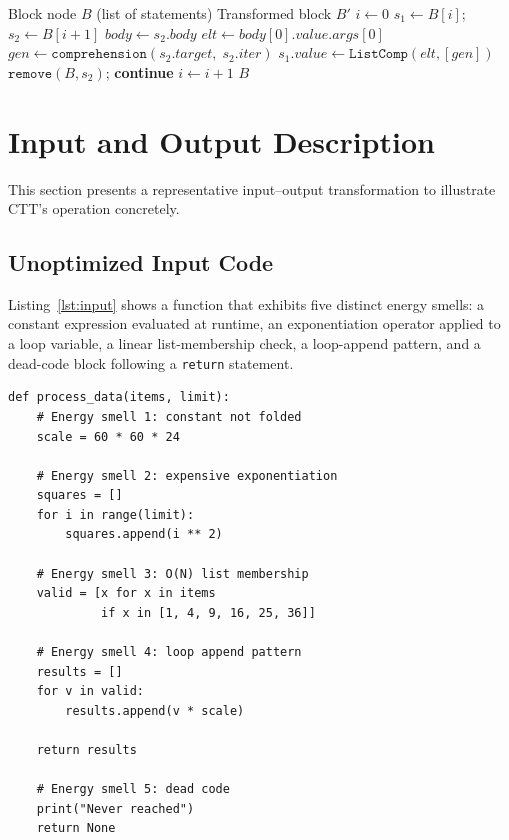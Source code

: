 \documentclass[conference]{IEEEtran}
\begin{document}
\begin{algorithm}[H]
\caption{Loop-Append-to-Comprehension Sub-pass}
\label{alg:comp}
\begin{algorithmic}[1]
\REQUIRE Block node $B$ (list of statements)
\ENSURE  Transformed block $B'$
\STATE $i \leftarrow 0$
  \STATE $s_1 \leftarrow B[i]$; $s_2 \leftarrow B[i+1]$
    \STATE $\textit{body} \leftarrow s_2.\textit{body}$
        \STATE $\textit{elt} \leftarrow \textit{body}[0].\textit{value}.\textit{args}[0]$
        \STATE $\textit{gen} \leftarrow \texttt{comprehension}(s_2.\textit{target},\; s_2.\textit{iter})$
        \STATE $s_1.\textit{value} \leftarrow \texttt{ListComp}(\textit{elt}, [\textit{gen}])$
        \STATE $\texttt{remove}(B, s_2)$; \textbf{continue}
      \ENDIF
    \ENDIF
  \ENDIF
  \STATE $i \leftarrow i + 1$
\ENDWHILE
\RETURN $B$
\end{algorithmic}
\end{algorithm}

\section{Input and Output Description}

This section presents a representative input--output transformation to
illustrate CTT's operation concretely.

\subsection{Unoptimized Input Code}

Listing~\ref{lst:input} shows a function that exhibits five distinct energy
smells: a constant expression evaluated at runtime, an exponentiation
operator applied to a loop variable, a linear list-membership check, a
loop-append pattern, and a dead-code block following a \texttt{return}
statement.

\begin{lstlisting}[caption={Unoptimized Python input.}, label=lst:input]
def process_data(items, limit):
    # Energy smell 1: constant not folded
    scale = 60 * 60 * 24

    # Energy smell 2: expensive exponentiation
    squares = []
    for i in range(limit):
        squares.append(i ** 2)

    # Energy smell 3: O(N) list membership
    valid = [x for x in items
             if x in [1, 4, 9, 16, 25, 36]]

    # Energy smell 4: loop append pattern
    results = []
    for v in valid:
        results.append(v * scale)

    return results

    # Energy smell 5: dead code
    print("Never reached")
    return None
\end{lstlisting}
\end{document}
